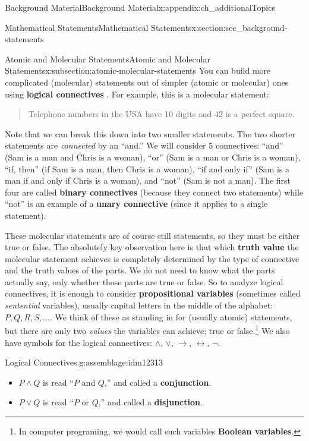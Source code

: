 \documentclass[oneside,10pt,]{book}
\newcommand{\terminology}[1]{\textbf{#1}}
\numberwithin{equation}{chapter}
\def\iff{\leftrightarrow}
\def\imp{\rightarrow}
\begin{document}
\begin{appendixptx}{Background Material}{}{Background Material}{}{}{x:appendix:ch_additionalTopics}
\begin{sectionptx}{Mathematical Statements}{}{Mathematical Statements}{}{}{x:section:sec_background-statements}
\begin{subsectionptx}{Atomic and Molecular Statements}{}{Atomic and Molecular Statements}{}{}{x:subsection:atomic-molecular-statements}
You can build more complicated (molecular) statements out of simpler (atomic or molecular) ones using \terminology{logical connectives} . For example, this is a molecular statement:%
\begin{quote}%
Telephone numbers in the USA have 10 digits and 42 is a perfect square.%
\end{quote}
Note that we can break this down into two smaller statements. The two shorter statements are \emph{connected} by an ``and.'' We will consider 5 connectives: ``and'' (Sam is a man and Chris is a woman), ``or'' (Sam is a man or Chris is a woman), ``if\textellipsis{}, then\textellipsis{}'' (if Sam is a man, then Chris is a woman), ``if and only if'' (Sam is a man if and only if Chris is a woman), and ``not'' (Sam is not a man). The first four are called \terminology{binary connectives} (because they connect two statements) while ``not'' is an example of a \terminology{unary connective} (since it applies to a single statement).%
\par
These molecular statements are of course still statements, so they must be either true or false.  The absolutely key observation here is that which \terminology{truth value}  the molecular statement achieves is completely determined by the type of connective and the truth values of the parts. We do not need to know what the parts actually say, only whether those parts are true or false. So to analyze logical connectives, it is enough to consider \terminology{propositional variables} (sometimes called \emph{sentential} variables), usually capital letters in the middle of the alphabet: \(P, Q, R, S, \ldots\).  We think of these as standing in for (usually atomic) statements, but there are only two \emph{values} the variables can achieve: true or false.\footnote{In computer programing, we would call such variables \terminology{Boolean variables}.\label{g:fn:idm12303}} \label{g:notation:idm12305} We also have symbols for the logical connectives: \(\wedge\), \(\vee\), \(\imp\), \(\iff\), \(\neg\).%
\begin{assemblage}{Logical Connectives.}{g:assemblage:idm12313}%
%
\begin{itemize}[label=\textbullet]
\item{}\(P \wedge Q\) is read ``\(P\) and \(Q\),'' and called a \terminology{conjunction}.  \label{g:notation:idm12328}%
\item{}\(P \vee Q\) is read ``\(P\) or \(Q\),'' and called a \terminology{disjunction}.  \label{g:notation:idm12343}%

\end{itemize}
\end{assemblage}
\end{subsectionptx}
\end{sectionptx}
\end{appendixptx}
\end{document}
